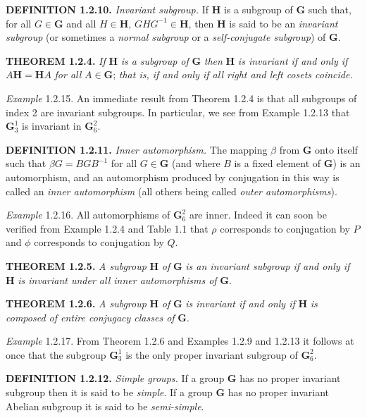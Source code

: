 \documentclass[11pt,a4paper,twoside,openright]{book}
\begin{document}
\textbf{DEFINITION 1.2.10.} \textit{Invariant subgroup.} If $\mathbf{H}$ is a subgroup of $\mathbf{G}$ such that, for all $G \in \mathbf{G}$ and all $H \in \mathbf{H}$, $GHG^{-1} \in \mathbf{H}$, then $\mathbf{H}$ is said to be an \textit{invariant subgroup} (or sometimes a \textit{normal subgroup} or a \textit{self-conjugate subgroup}) of $\mathbf{G}$.

\textbf{THEOREM 1.2.4.} \textit{If} $\mathbf{H}$ \textit{is a subgroup of} $\mathbf{G}$ \textit{then} $\mathbf{H}$ \textit{is invariant if and only if} $A\mathbf{H} = \mathbf{H}A$ \textit{for all} $A \in \mathbf{G}$; \textit{that is, if and only if all right and left cosets coincide.}

\textit{Example} 1.2.15. An immediate result from Theorem 1.2.4 is that all subgroups of index 2 are invariant subgroups. In particular, we see from Example 1.2.13 that $\mathbf{G}_3^1$ is invariant in $\mathbf{G}_6^2$.

\textbf{DEFINITION 1.2.11.} \textit{Inner automorphism.} The mapping $\beta$ from $\mathbf{G}$ onto itself such that $\beta G = BGB^{-1}$ for all $G \in \mathbf{G}$ (and where $B$ is a fixed element of $\mathbf{G}$) is an automorphism, and an automorphism produced by conjugation in this way is called an \textit{inner automorphism} (all others being called \textit{outer automorphisms}).

\textit{Example} 1.2.16. All automorphisms of $\mathbf{G}_6^2$ are inner. Indeed it can soon be verified from Example 1.2.4 and Table 1.1 that $\rho$ corresponds to conjugation by $P$ and $\phi$ corresponds to conjugation by $Q$.

\textbf{THEOREM 1.2.5.} \textit{A subgroup} $\mathbf{H}$ \textit{of} $\mathbf{G}$ \textit{is an invariant subgroup if and only if} $\mathbf{H}$ \textit{is invariant under all inner automorphisms of} $\mathbf{G}$.

\textbf{THEOREM 1.2.6.} \textit{A subgroup} $\mathbf{H}$ \textit{of} $\mathbf{G}$ \textit{is invariant if and only if} $\mathbf{H}$ \textit{is composed of entire conjugacy classes of} $\mathbf{G}$.

\textit{Example} 1.2.17. From Theorem 1.2.6 and Examples 1.2.9 and 1.2.13 it follows at once that the subgroup $\mathbf{G}_3^1$ is the only proper invariant subgroup of $\mathbf{G}_6^2$.

\textbf{DEFINITION 1.2.12.} \textit{Simple groups.} If a group $\mathbf{G}$ has no proper invariant subgroup then it is said to be \textit{simple}. If a group $\mathbf{G}$ has no proper invariant Abelian subgroup it is said to be \textit{semi-simple}.
\end{document}
